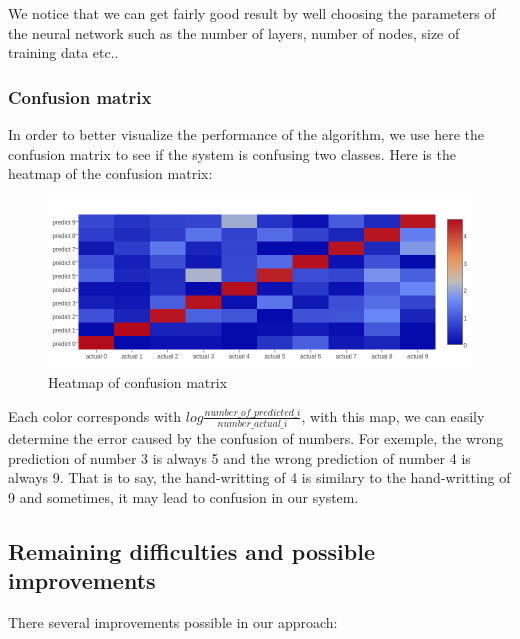 \documentclass[paper=a4, french, 11pt]{scrartcl}
\begin{document}
We notice that we can get fairly good result by well choosing the parameters of the neural network such as the number of layers, number of nodes, size of training data etc.. 

\subsubsection{Confusion matrix} \mbox{} \vspace{-0.5cm}

In order to better visualize the performance of the algorithm, we use here the confusion matrix to see if the system is confusing two classes. Here is the heatmap of the confusion matrix:

\begin{figure}[h]
\vspace{-1ex}
\begin{center}
   \includegraphics[width=1.0\linewidth]{heatmap_log.png}
\end{center}
\vspace{-3ex}
\caption{Heatmap of confusion matrix}
\label{fig:heatmap}
\end{figure}

Each color corresponds with $log\frac{number\_of\_predicted\_i}{number\_actual\_ i}$, with this map, we can easily determine the error caused by the confusion of numbers. For exemple, the wrong prediction of number 3 is always 5 and the wrong prediction of number 4 is always 9. That is to say, the hand-writting of 4 is similary to the hand-writting of 9 and sometimes, it may lead to confusion in our system.

\subsection{Remaining difficulties and possible improvements} \mbox{} \vspace{-0.5cm}

There several improvements possible in our approach:
\end{document}
